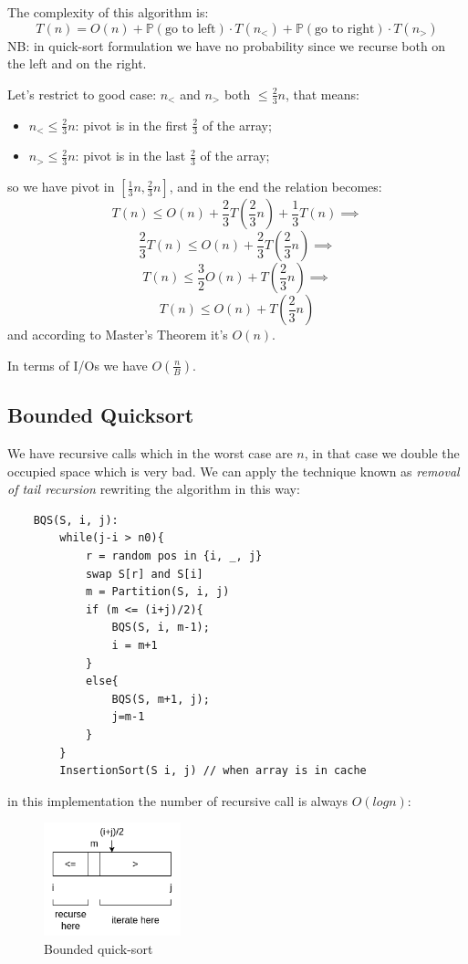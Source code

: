 The complexity of this algorithm is:
$$
    T(n) = O(n) + \mathbb{P}(\text{go to left}) \cdot T(n_<) + \mathbb{P} (\text{go to right}) \cdot T(n_>)
$$
NB: in quick-sort formulation we have no probability since we recurse both on the left and on the right.

Let's restrict to good case: $n_<$ and $n_>$ both $\leq \frac{2}{3}n$, that means:
\begin{itemize}
    \item $n_< \leq \frac{2}{3}n$: pivot is in the first $\frac{2}{3}$ of the array;
    \item $n_> \leq \frac{2}{3}n$: pivot is in the last $\frac{2}{3}$ of the array;
\end{itemize}
so we have pivot in $[\frac{1}{3}n, \frac{2}{3}n]$, and in the end the relation becomes:
$$
    T(n) \leq O(n) + \frac{2}{3} T \left( \frac{2}{3}n \right) + \frac{1}{3}T(n) \implies
$$
$$
    \frac{2}{3}T(n) \leq O(n) + \frac{2}{3} T \left( \frac{2}{3}n \right) \implies
$$
$$
    T(n) \leq \frac{3}{2}O(n) + T \left( \frac{2}{3}n \right) \implies
$$
$$
    T(n) \leq O(n) + T \left( \frac{2}{3}n \right)
$$
and according to Master's Theorem it's $O(n)$.

In terms of I/Os we have $O\left( \frac{n}{B} \right)$.


\subsection{Bounded Quicksort}
We have recursive calls which in the worst case are $n$, in that case we double the occupied space which is very bad.
We can apply the technique known as \emph{removal of tail recursion} rewriting the algorithm in this way:
\begin{verbatim}
    BQS(S, i, j):
        while(j-i > n0){
            r = random pos in {i, _, j}
            swap S[r] and S[i]
            m = Partition(S, i, j)
            if (m <= (i+j)/2){
                BQS(S, i, m-1);
                i = m+1
            }
            else{
                BQS(S, m+1, j);
                j=m-1
            }
        }
        InsertionSort(S i, j) // when array is in cache
\end{verbatim}
in this implementation the number of recursive call is always $O(logn)$:
\begin{figure}[H]
    \centering
    \includegraphics[width=150px]{images/2_Sorting/bqs.png}
    \caption{Bounded quick-sort}
\end{figure}

